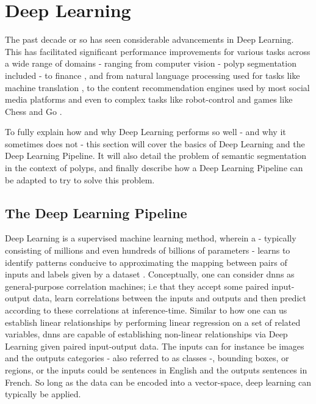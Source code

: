 \section{Deep Learning}
The past decade or so has seen considerable advancements in Deep Learning. This has facilitated significant performance improvements for various tasks across a wide range of domains - ranging from computer vision \cite{computer_vision} - polyp segmentation included - to finance \cite{dl_finance}, and from natural language processing used for tasks like machine translation \cite{dl_nlp}, to the content recommendation engines used by most social media platforms \cite{dl_recommend} and even to complex tasks like robot-control \cite{dl_robotics} and games like Chess and Go \cite{dl_go}. 

To fully explain how and why Deep Learning performs so well - and why it sometimes does not - this section will cover the basics of Deep Learning and the Deep Learning Pipeline. It will also detail the problem of semantic segmentation in the context of polyps, and finally describe how a Deep Learning Pipeline can be adapted to try to solve this problem.

\subsection{The Deep Learning Pipeline}
    Deep Learning is a supervised machine learning method, wherein a  - typically consisting of millions and even hundreds of billions of parameters - learns to identify patterns conducive to approximating the mapping between pairs of inputs and labels given by a dataset \cite{deep_learning_book}. Conceptually, one can consider \glspl{dnn} as general-purpose correlation machines; i.e that they accept some paired input-output data, learn correlations between the inputs and outputs and then predict according to these correlations at inference-time. Similar to how one can us establish linear relationships by performing linear regression on a set of related variables, \glspl{dnn} are capable of establishing non-linear relationships via Deep Learning given paired input-output data. The inputs can for instance be images and the outputs categories - also referred to as classes -, bounding boxes, or regions, or the inputs could be sentences in English and the outputs sentences in French. So long as the data can be encoded into a vector-space, deep learning can typically be applied. 
    
